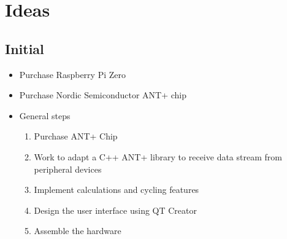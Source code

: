 \documentclass[letterpaper]{article}
\begin{document}
\section{Ideas}

\subsection{Initial}


\begin{itemize}
   \item Purchase Raspberry Pi Zero
   \item Purchase Nordic Semiconductor ANT+ chip
   \item General steps
   \begin{enumerate}
      \item Purchase ANT+ Chip
      \item Work to adapt a C++ ANT+ library to receive data stream from peripheral devices
      \item Implement calculations and cycling features
      \item Design the user interface using QT Creator
      \item Assemble the hardware  
   \end{enumerate}
\end{itemize}
\end{document}
